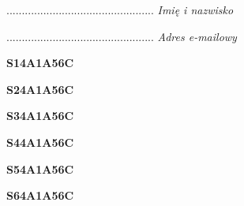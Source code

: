 \begin{turn}{90}\begin{minipage}{\linewidth} \vspace{20mm} ................................................  \textit{Imię i nazwisko}\end{minipage}\end{turn}

\begin{turn}{90}\begin{minipage}{\linewidth} \vspace{20mm} ................................................  \textit{Adres e-mailowy}\end{minipage}\end{turn}

\begin{turn}{90}\huge \begin{minipage}{\linewidth} \vspace{10mm}\textbf{S14A1A56C}\end{minipage}\end{turn}

\begin{turn}{90}\huge \begin{minipage}{\linewidth} \vspace{10mm}\textbf{S24A1A56C}\end{minipage}\end{turn}

\begin{turn}{90}\huge \begin{minipage}{\linewidth} \vspace{10mm}\textbf{S34A1A56C}\end{minipage}\end{turn}

\begin{turn}{90}\huge \begin{minipage}{\linewidth} \vspace{10mm}\textbf{S44A1A56C}\end{minipage}\end{turn}

\begin{turn}{90}\huge \begin{minipage}{\linewidth} \vspace{10mm}\textbf{S54A1A56C}\end{minipage}\end{turn}

\begin{turn}{90}\huge \begin{minipage}{\linewidth} \vspace{10mm}\textbf{S64A1A56C}\end{minipage}\end{turn}

